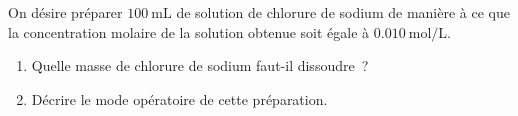 On désire préparer $\qty{100}{\mL}$ de solution de chlorure de sodium de manière
à ce que la concentration molaire de la solution obtenue soit égale à
$\qty{0.010}{\mol\per\L}$.
\begin{enumerate}
    \item Quelle masse de chlorure de sodium faut-il dissoudre~?
    \item Décrire le mode opératoire de cette préparation.
\end{enumerate}

